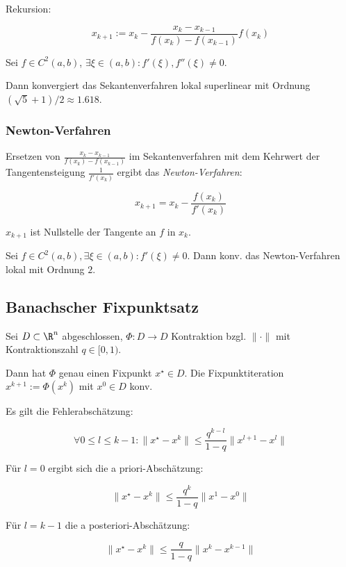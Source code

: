 Rekursion:

\vspace*{-4mm}
$$x_{k+1} := x_k - \frac{x_k-x_{k-1}}{f(x_k)-f(x_{k-1})}f(x_k)$$

\spacing

Sei $f \in C^2(a,b)$, $\exists \xi \in (a,b) : f'(\xi), f''(\xi) \neq 0$.

Dann konvergiert das Sekantenverfahren lokal superlinear mit Ordnung $(\sqrt{5}+1)/2 \approx 1.618$.

\subsubsection*{Newton-Verfahren}

Ersetzen von $\frac{x_k-x_{k-1}}{f(x_k)-f(x_{k-1})}$ im Sekantenverfahren mit dem Kehrwert der Tangentensteigung $\frac{1}{f'(x_k)}$ ergibt das \emph{Newton-Verfahren}:

\vspace*{-2mm}
$$x_{k+1} = x_k - \frac{f(x_k)}{f'(x_k)}$$

$x_{k+1}$ ist Nullstelle der Tangente an $f$ in $x_k$.

\spacing

Sei $f \in C^2(a,b), \exists \xi \in (a,b) : f'(\xi) \neq 0$. Dann konv. das Newton-Verfahren lokal mit Ordnung $2$.

\subsection*{Banachscher Fixpunktsatz}

Sei $D \subset \R^n$ abgeschlossen, $\Phi : D \to D$ Kontraktion bzgl. $\|\cdot\|$ mit Kontraktionszahl $q \in [0,1)$.

Dann hat $\Phi$ genau einen Fixpunkt $x^\star \in D$. Die Fixpunktiteration $x^{k+1} := \Phi(x^k)$ mit $x^0 \in D$ konv.

Es gilt die Fehlerabschätzung:

\vspace*{-6mm}
$$\forall 0 \leq l \leq k - 1 : \|x^\star - x^k\| \leq \frac{q^{k-l}}{1-q} \|x^{l+1} - x^l\|$$

Für $l=0$ ergibt sich die a priori-Abschätzung:

\vspace*{-2mm}
$$\|x^\star - x^k\| \leq \frac{q^k}{1-q} \|x^1 - x^0\|$$

Für $l=k-1$ die a posteriori-Abschätzung:

\vspace*{-2mm}
$$\|x^\star - x^k\| \leq \frac{q}{1-q} \|x^k - x^{k-1}\|$$

